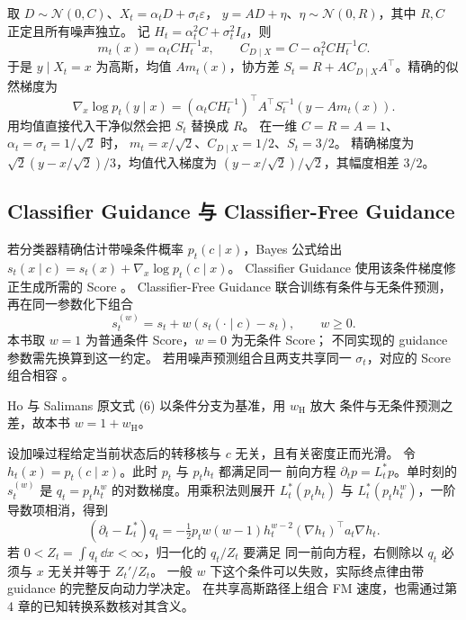 \begin{example}[线性高斯逆问题的精确噪声似然]
取 \(D\sim\mathcal N(0,C)\)、\(X_t=\alpha_tD+\sigma_t\varepsilon\)，
\(y=AD+\eta\)、\(\eta\sim\mathcal N(0,R)\)，其中 \(R,C\) 正定且所有噪声独立。
记 \(H_t=\alpha_t^2C+\sigma_t^2I_d\)，则
\[
 m_t(x)=\alpha_tCH_t^{-1}x,\qquad
 C_{D\mid X}=C-\alpha_t^2CH_t^{-1}C.
\]
于是 \(y\mid X_t=x\) 为高斯，均值 \(Am_t(x)\)，协方差
\(S_t=R+AC_{D\mid X}A^\top\)。精确的似然梯度为
\begin{equation}
 \nabla_x\log p_t(y\mid x)
 =(\alpha_tCH_t^{-1})^\top A^\top S_t^{-1}(y-Am_t(x)).
 \label{eq:unified-linear-likelihood}
\end{equation}
用均值直接代入干净似然会把 \(S_t\) 替换成 \(R\)。
在一维 \(C=R=A=1\)、\(\alpha_t=\sigma_t=1/\sqrt2\) 时，
\(m_t=x/\sqrt2\)、\(C_{D\mid X}=1/2\)、\(S_t=3/2\)。
精确梯度为 \(\sqrt2(y-x/\sqrt2)/3\)，均值代入梯度为
\((y-x/\sqrt2)/\sqrt2\)，其幅度相差 \(3/2\)。
\end{example}

\subsection{Classifier Guidance 与 Classifier-Free Guidance}

若分类器精确估计带噪条件概率 \(p_t(c\mid x)\)，Bayes 公式给出
\(s_t(x\mid c)=s_t(x)+\nabla_x\log p_t(c\mid x)\)。
Classifier Guidance 使用该条件梯度修正生成所需的 Score
\cite{dhariwal2021guided}。
Classifier-Free Guidance 联合训练有条件与无条件预测，再在同一参数化下组合
\begin{equation}
 s_t^{(w)}=s_t+w(s_t(\cdot\mid c)-s_t),\qquad w\ge0.
 \label{eq:unified-cfg}
\end{equation}
本书取 \(w=1\) 为普通条件 Score，\(w=0\) 为无条件 Score；
不同实现的 guidance 参数需先换算到这一约定。
若用噪声预测组合且两支共享同一 \(\sigma_t\)，对应的 Score 组合相容
\cite{ho2022cfg}。

Ho 与 Salimans 原文式 (6) 以条件分支为基准，用 \(w_{\mathrm{H}}\) 放大
条件与无条件预测之差，故本书 \(w=1+w_{\mathrm H}\)。

设加噪过程给定当前状态后的转移核与 \(c\) 无关，且有关密度正而光滑。
令 \(h_t(x)=p_t(c\mid x)\)。此时 \(p_t\) 与 \(p_th_t\) 都满足同一
前向方程 \(\partial_t p=L_t^*p\)。单时刻的 \(s_t^{(w)}\) 是
\(q_t=p_th_t^w\) 的对数梯度。用乘积法则展开
\(L_t^*(p_th_t)\) 与 \(L_t^*(p_th_t^w)\)，一阶导数项相消，得到
\[
 (\partial_t-L_t^*)q_t
 =-\tfrac12 p_t w(w-1)h_t^{w-2}(\nabla h_t)^\top a_t\nabla h_t .
\]
若 \(0<Z_t=\int q_t\,\dd x<\infty\)，归一化的 \(q_t/Z_t\) 要满足
同一前向方程，右侧除以 \(q_t\) 必须与 \(x\) 无关并等于 \(Z_t'/Z_t\)。
一般 \(w\) 下这个条件可以失败，实际终点律由带 guidance 的完整反向动力学决定。
在共享高斯路径上组合 FM 速度，也需通过第 4 章的已知转换系数核对其含义。

